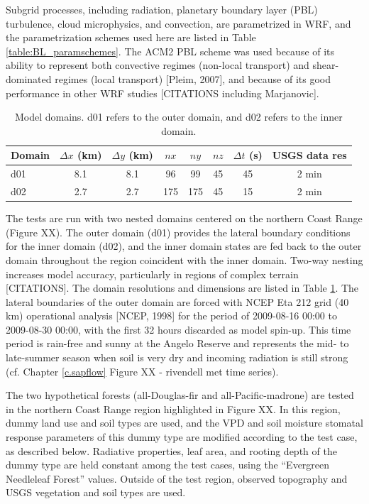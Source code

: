 Subgrid processes, including radiation, planetary boundary layer (PBL) turbulence, cloud microphysics, and convection, are parametrized in WRF, and the parametrization schemes used here are listed in Table \ref{table:BL_paramschemes}.  The ACM2 PBL scheme was used because of its ability to represent both convective regimes (non-local transport) and shear-dominated regimes (local transport) [Pleim, 2007], and because of its good performance in other WRF studies [CITATIONS including Marjanovic].

\begin{table}
\begin{tabular}{ l c c c c c c c }
\hline
Domain & $\Delta x$ (km) & $\Delta y$ (km) & $nx$ & $ny$ & $nz$ & $\Delta t$ (s) & USGS data res \\ \hline
d01 & 8.1 & 8.1 & 96 & 99 & 45 & 45 & 2 min\\
d02 & 2.7 & 2.7 & 175 & 175 & 45 & 15 & 2 min\\
\hline
\end{tabular}
\caption{Model domains. d01 refers to the outer domain, and d02 refers to the inner domain.}
\label{table:BL_domains}
\end{table}

The tests are run with two nested domains centered on the northern Coast Range (Figure XX).  The outer domain (d01) provides the lateral boundary conditions for the inner domain (d02), and the inner domain states are fed back to the outer domain throughout the region coincident with the inner domain.  Two-way nesting increases model accuracy, particularly in regions of complex terrain [CITATIONS].  The domain resolutions and dimensions are listed in Table \ref{table:BL_domains}.  The lateral boundaries of the outer domain are forced with NCEP Eta 212 grid (40 km) operational analysis [NCEP, 1998] for the period of 2009-08-16 00:00 to 2009-08-30 00:00, with the first 32 hours discarded as model spin-up.  This time period is rain-free and sunny at the Angelo Reserve and represents the mid- to late-summer season when soil is very dry and incoming radiation is still strong (cf. Chapter \ref{c.sapflow} Figure XX - rivendell met time series).

The two hypothetical forests (all-Douglas-fir and all-Pacific-madrone) are tested in the northern Coast Range region highlighted in Figure XX.  In this region, dummy land use and soil types are used, and the VPD and soil moisture stomatal response parameters of this dummy type are modified according to the test case, as described below.  Radiative properties, leaf area, and rooting depth of the dummy type are held constant among the test cases, using the ``Evergreen Needleleaf Forest'' values.  Outside of the test region, observed topography and USGS vegetation and soil types are used.

